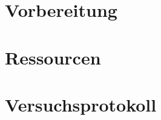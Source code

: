 \documentclass[
    twoside=true, 
    footinclude=off, 
    captions=tableheading, 
    DIV=12;usenames,
    dvipsnames
]{scrbook}
\begin{document}
    \newpage
    \section{Vorbereitung}
        

    \newpage
    \section{Ressourcen}
        

    \newpage
    \section{Versuchsprotokoll}
        

    




%
\end{document}
